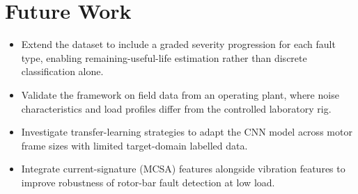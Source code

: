 \documentclass[12pt,a4paper]{report}
\begin{document}
\section{Future Work}
\begin{itemize}
  \item Extend the dataset to include a graded severity progression for each fault type, enabling
        remaining-useful-life estimation rather than discrete classification alone.
  \item Validate the framework on field data from an operating plant, where noise characteristics
        and load profiles differ from the controlled laboratory rig.
  \item Investigate transfer-learning strategies to adapt the CNN model across motor frame sizes
        with limited target-domain labelled data.
  \item Integrate current-signature (MCSA) features alongside vibration features to improve
        robustness of rotor-bar fault detection at low load.
\end{itemize}
\end{document}

